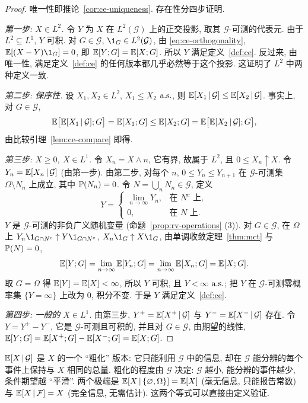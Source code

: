 \begin{proof}
唯一性即推论~\ref{cor:ce-uniqueness}. 存在性分四步证明.

\emph{第一步: $X\in L^2$.} 令 $Y$ 为 $X$ 在 $L^2(\mathcal{G})$ 上的正交投影, 取其 $\mathcal{G}$-可测的代表元. 由于 $L^2\subseteq L^1$, $Y$ 可积. 对 $G\in\mathcal{G}$, $\1_G\in L^2(\mathcal{G})$, 由 \eqref{eq:ce-orthogonality}, $\E[(X-Y)\1_G]=0$, 即 $\E[Y;G]=\E[X;G]$. 所以 $Y$ 满足定义~\ref{def:ce}. 反过来, 由唯一性, 满足定义~\ref{def:ce} 的任何版本都几乎必然等于这个投影. 这证明了 $L^2$ 中两种定义一致.

\emph{第二步: 保序性.} 设 $X_1,X_2\in L^2$, $X_1\le X_2$ $\as$, 则 $\E[X_1\,|\,\mathcal{G}]\le\E[X_2\,|\,\mathcal{G}]$. 事实上, 对 $G\in\mathcal{G}$,
\[
\E\big[\E[X_1\,|\,\mathcal{G}];G\big]=\E[X_1;G]\le\E[X_2;G]=\E\big[\E[X_2\,|\,\mathcal{G}];G\big],
\]
由比较引理~\ref{lem:ce-compare} 即得.

\emph{第三步: $X\ge0$, $X\in L^1$.} 令 $X_n=X\wedge n$, 它有界, 故属于 $L^2$, 且 $0\le X_n\uparrow X$. 令 $Y_n=\E[X_n\,|\,\mathcal{G}]$ (由第一步). 由第二步, 对每个 $n$, $0\le Y_n\le Y_{n+1}$ 在 $\mathcal{G}$-可测集 $\Omega\setminus N_n$ 上成立, 其中 $\P(N_n)=0$. 令 $N=\bigcup_nN_n\in\mathcal{G}$, 定义
\[
Y=\begin{cases}\lim_{n\to\infty}Y_n, & \text{在 } N^c \text{ 上},\\ 0, & \text{在 } N \text{ 上}.\end{cases}
\]
$Y$ 是 $\mathcal{G}$-可测的非负广义随机变量 (命题~\ref{prop:rv-operations} (3)). 对 $G\in\mathcal{G}$, 在 $\Omega$ 上 $Y_n\1_{G\cap N^c}\uparrow Y\1_{G\cap N^c}$, $X_n\1_G\uparrow X\1_G$, 由单调收敛定理~\ref{thm:mct} 与 $\P(N)=0$,
\[
\E[Y;G]=\lim_{n\to\infty}\E[Y_n;G]=\lim_{n\to\infty}\E[X_n;G]=\E[X;G].
\]
取 $G=\Omega$ 得 $\E[Y]=\E[X]<\infty$, 所以 $Y$ 可积, 且 $Y<\infty$ $\as$; 把 $Y$ 在 $\mathcal{G}$-可测零概率集 $\{Y=\infty\}$ 上改为 $0$, 积分不变. 于是 $Y$ 满足定义~\ref{def:ce}.

\emph{第四步: 一般的 $X\in L^1$.} 由第三步, $Y^+=\E[X^+\,|\,\mathcal{G}]$ 与 $Y^-=\E[X^-\,|\,\mathcal{G}]$ 存在. 令 $Y=Y^+-Y^-$, 它是 $\mathcal{G}$-可测且可积的, 并且对 $G\in\mathcal{G}$, 由期望的线性,
$\E[Y;G]=\E[X^+;G]-\E[X^-;G]=\E[X;G]$.
\end{proof}

\begin{intuition}
$\E[X\,|\,\mathcal{G}]$ 是 $X$ 的一个 ``粗化'' 版本: 它只能利用 $\mathcal{G}$ 中的信息, 却在 $\mathcal{G}$ 能分辨的每个事件上保持与 $X$ 相同的总量. 粗化的程度由 $\mathcal{G}$ 决定: $\mathcal{G}$ 越小, 能分辨的事件越少, 条件期望越 ``平滑''. 两个极端是 $\E[X\,|\,\{\varnothing,\Omega\}]=\E[X]$ (毫无信息, 只能报告常数) 与 $\E[X\,|\,\mathcal{F}]=X$ (完全信息, 无需估计). 这两个等式可以直接由定义验证.
\end{intuition}

